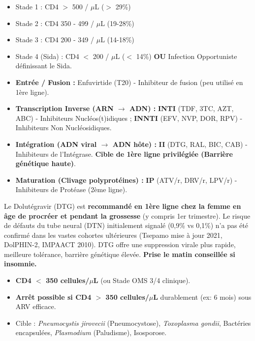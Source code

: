 \documentclass[11pt]{article}
\begin{document}
\begin{definition}
\begin{itemize}
    \item Stade 1 : CD4 $>$ 500 / $\mu$L ($>$ 29\%)
    \item Stade 2 : CD4 350 - 499 / $\mu$L (19-28\%)
    \item Stade 3 : CD4 200 - 349 / $\mu$L (14-18\%)
    \item Stade 4 (Sida) : CD4 $<$ 200 / $\mu$L ($<$ 14\%) \textbf{OU} Infection Opportuniste définissant le Sida.
\end{itemize}
\end{definition}

\begin{propriete}
\begin{itemize}
    \item \textbf{Entrée / Fusion :} Enfuvirtide (T20) - Inhibiteur de fusion (peu utilisé en 1ère ligne).
    \item \textbf{Transcription Inverse (ARN $\rightarrow$ ADN) :} \textbf{INTI} (TDF, 3TC, AZT, ABC) - Inhibiteurs Nucléos(t)idiques ; \textbf{INNTI} (EFV, NVP, DOR, RPV) - Inhibiteurs Non Nucléosidiques.
    \item \textbf{Intégration (ADN viral $\rightarrow$ ADN hôte) :} \textbf{II} (DTG, RAL, BIC, CAB) - Inhibiteurs de l'Intégrase. \textbf{Cible de 1ère ligne privilégiée (Barrière génétique haute)}.
    \item \textbf{Maturation (Clivage polyprotéines) :} \textbf{IP} (ATV/r, DRV/r, LPV/r) - Inhibiteurs de Protéase (2ème ligne).
\end{itemize}
\end{propriete}

\begin{aretenir}
Le Dolutégravir (DTG) est \textbf{recommandé en 1ère ligne chez la femme en âge de procréer et pendant la grossesse} (y compris 1er trimestre). Le risque de défauts du tube neural (DTN) initialement signalé (0,9\% vs 0,1\%) n'a pas été confirmé dans les vastes cohortes ultérieures (Tsepamo mise à jour 2021, DolPHIN-2, IMPAACT 2010). DTG offre une suppression virale plus rapide, meilleure tolérance, barrière génétique élevée. \textbf{Prise le matin conseillée si insomnie.}
\end{aretenir}

\begin{aretenir}
\begin{itemize}
    \item \textbf{CD4 $<$ 350 cellules/$\mu$L} (ou Stade OMS 3/4 clinique).
    \item \textbf{Arrêt possible si CD4 $>$ 350 cellules/$\mu$L} durablement (ex: 6 mois) sous ARV efficace.
    \item Cible : \emph{Pneumocystis jirovecii} (Pneumocystose), \emph{Toxoplasma gondii}, Bactéries encapsulées, \emph{Plasmodium} (Paludisme), Isosporose.
\end{itemize}
\end{aretenir}
\end{document}

